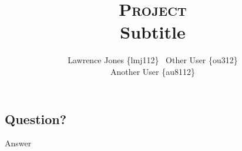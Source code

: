 \documentclass[11pt]{article}
\title{\textsc{Project}\\Subtitle}
\author{Lawrence Jones \{lmj112\} \  Other User \{ou312\} \\
        Another User \{au8112\}}
\date{}
\begin{document}
\maketitle


\subsection*{Question?}

Answer~\cite{exampleReference}


\medskip


\newpage
\end{document}
